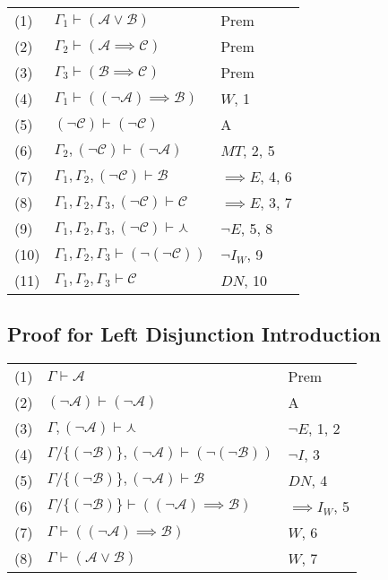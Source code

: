 \documentclass[12pt]{article}
\newcommand{\mc}[1]{\mathcal{#1}}
\begin{document}
\begin{center}
\begin{tabular}{ p{1cm} p{6cm} p{3cm} }
(1) & $\Gamma_1 \vdash (\mc{A} \lor \mc{B})$ & Prem\\
(2) & $\Gamma_2 \vdash (\mc{A} \implies \mc{C})$ & Prem\\
(3) & $\Gamma_3 \vdash (\mc{B} \implies \mc{C})$ & Prem\\
(4) & $\Gamma_1 \vdash ((\lnot \mc{A}) \implies \mc{B})$ & $W$, 1\\
(5) & $(\lnot \mc{C}) \vdash (\lnot \mc{C})$ & A\\
(6) & $\Gamma_2, (\lnot \mc{C}) \vdash (\lnot \mc{A})$ & $MT$, 2, 5\\
(7) & $\Gamma_1, \Gamma_2, (\lnot \mc{C}) \vdash \mc{B}$ & $\implies E$, 4, 6\\
(8) & $\Gamma_1, \Gamma_2, \Gamma_3, (\lnot \mc{C}) \vdash \mc{C}$ & $\implies E$, 3, 7\\
(9) & $\Gamma_1, \Gamma_2, \Gamma_3, (\lnot \mc{C}) \vdash \curlywedge$ & $\lnot E$, 5, 8\\
(10) & $\Gamma_1, \Gamma_2, \Gamma_3 \vdash (\lnot(\lnot \mc{C}))$ & $\lnot I_W$, 9\\
(11) & $\Gamma_1, \Gamma_2, \Gamma_3 \vdash \mc{C}$ & $DN$, 10
\end{tabular}
\end{center}

\subsection*{Proof for Left Disjunction Introduction}

\begin{center}
\begin{tabular}{ p{1cm} p{6cm} p{3cm} }
(1) & $\Gamma \vdash \mc{A}$ & Prem\\
(2) & $(\lnot \mc{A}) \vdash (\lnot \mc{A})$ & A\\
(3) & $\Gamma, (\lnot \mc{A}) \vdash \curlywedge$ & $\lnot E$, 1, 2\\
(4) & $\Gamma/\{(\lnot \mc{B})\}, (\lnot \mc{A}) \vdash (\lnot (\lnot \mc{B}))$ & $\lnot I$, 3\\
(5) & $\Gamma/\{(\lnot \mc{B})\}, (\lnot \mc{A}) \vdash \mc{B}$ & $DN$, 4\\
(6) & $\Gamma/\{(\lnot \mc{B})\} \vdash ((\lnot \mc{A}) \implies \mc{B})$ & $\implies I_W$, 5\\
(7) & $\Gamma \vdash ((\lnot \mc{A}) \implies \mc{B})$ & $W$, 6\\
(8) & $\Gamma \vdash (\mc{A} \lor \mc{B})$ & $W$, 7
\end{tabular}
\end{center}
\end{document}
